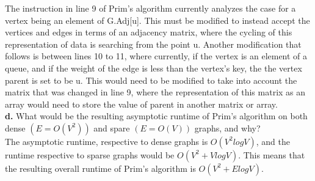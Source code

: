 \documentclass[12pt]{article}
\begin{document}
The instruction in line 9 of Prim's algorithm currently analyzes the case for a vertex being an element of G.Adj[u]. This must be modified to instead accept the vertices and edges in terms of an adjacency matrix, where the cycling of this representation of data is searching from the point u. Another modification that follows is between lines 10 to 11, where currently, if the vertex is an element of a queue, and if the weight of the edge is less than the vertex's key, the the vertex parent is set to be u. This would need to be modified to take into account the matrix that was changed in line 9, where the representation of this matrix as an array would need to store the value of parent in another matrix or array. \\
\linebreak
\textbf{d.} What would be the resulting asymptotic runtime of Prim's algorithm on both dense $(E = O(V^2))$ and spare $(E = O(V))$ graphs, and why? \\
\linebreak
The asymptotic runtime, respective to dense graphs is $O(V^2logV)$, and the runtime respective to sparse graphs would be $O(V^2 + VlogV)$. This means that the resulting overall runtime of Prim's algorithm is $O(V^2 + ElogV)$. \\
\end{document}
